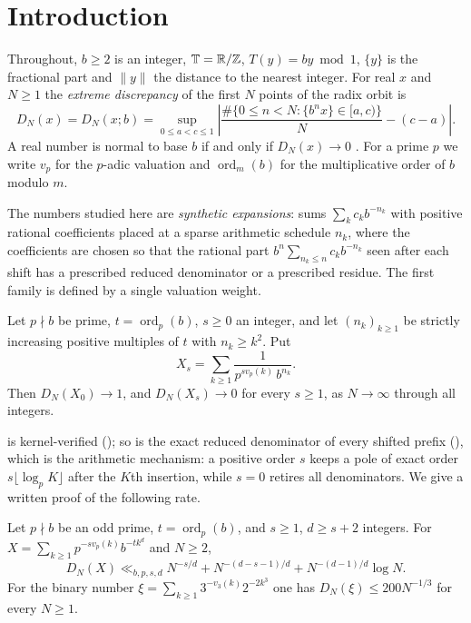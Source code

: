 \documentclass[11pt]{article}
\newcommand{\dist}[1]{\lVert #1\rVert}
\newcommand{\fr}[1]{\{#1\}}
\DeclareMathOperator{\ord}{ord}
\begin{document}
\section{Introduction}\label{sec:intro}

Throughout, $b\ge2$ is an integer, $\mathbb T=\mathbb R/\mathbb Z$, $T(y)=by\bmod 1$, $\fr{y}$ is the fractional part
and $\dist{y}$ the distance to the nearest integer. For real $x$ and $N\ge1$ the \emph{extreme
discrepancy} of the first $N$ points of the radix orbit is
\[
D_N(x)=D_N(x;b)=\sup_{0\le a<c\le 1}\left|\frac{\#\{0\le n<N:\fr{b^nx}\in[a,c)\}}{N}-(c-a)\right|.
\]
A real number is normal to base $b$ if and only if $D_N(x)\to0$ \cite[Chapter~1, Theorem~8.1,
p.~70 and Chapter~2, Theorem~1.1, p.~89]{KN}. For a prime $p$ we write $v_p$ for the $p$-adic
valuation and $\ord_m(b)$ for the multiplicative order of $b$ modulo $m$.

The numbers studied here are \emph{synthetic expansions}: sums $\sum_k c_kb^{-n_k}$ with
positive rational coefficients placed at a sparse arithmetic schedule $n_k$, where the coefficients
are chosen so that the rational part $b^n\sum_{n_k\le n}c_kb^{-n_k}$ seen after each shift has a
prescribed reduced denominator or a prescribed residue. The first family is defined by a single
valuation weight.

\begin{maintheorem}\label{thm:A}
Let $p\nmid b$ be prime, $t=\ord_p(b)$, $s\ge0$ an integer, and let $(n_k)_{k\ge1}$ be strictly
increasing positive multiples of $t$ with $n_k\ge k^2$. Put
\[
X_s=\sum_{k\ge1}\frac{1}{p^{s v_p(k)}\,b^{n_k}}.
\]
Then $D_N(X_0)\to1$, and $D_N(X_s)\to0$ for every $s\ge1$, as $N\to\infty$ through all integers.
\end{maintheorem}

 is kernel-verified (); so is the exact reduced denominator of every
shifted prefix (), which is the arithmetic mechanism: a positive order $s$ keeps a
pole of exact order $s\lfloor\log_pK\rfloor$ after the $K$th insertion, while $s=0$ retires all
denominators. We give a written proof of the following rate.

\begin{maintheorem}\label{thm:B}
Let $p\nmid b$ be an odd prime, $t=\ord_p(b)$, and $s\ge1$, $d\ge s+2$ integers. For
$X=\sum_{k\ge1}p^{-sv_p(k)}b^{-tk^d}$ and $N\ge2$,
\[
D_N(X)\ll_{b,p,s,d} N^{-s/d}+N^{-(d-s-1)/d}+N^{-(d-1)/d}\log N .
\]
For the binary number $\xi=\sum_{k\ge1}3^{-v_3(k)}2^{-2k^3}$ one has $D_N(\xi)\le 200N^{-1/3}$
for every $N\ge1$.
\end{maintheorem}
\end{document}
